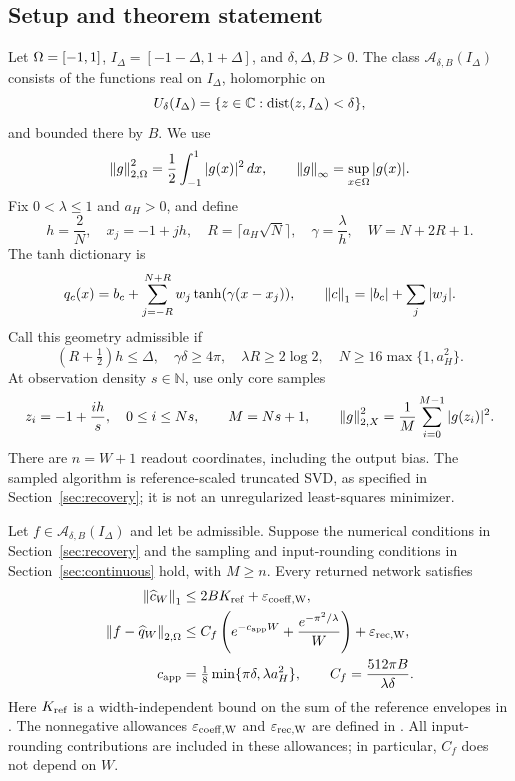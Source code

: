 \subsection{Setup and theorem statement}
\label{sec:setup}
Let $\Omega=[-1,1]$, $I_\Delta=[-1-\Delta,1+\Delta]$, and $\delta,\Delta,B>0$.
The class $\mathcal A_{\delta,B}(I_\Delta)$ consists of the functions real on
$I_\Delta$, holomorphic on
\[
 U_\delta(I_\Delta)=\{z\in\mathbb C:\operatorname{dist}(z,I_\Delta)<\delta\},
\]
and bounded there by $B$. We use
\[
 \left\lVert g\right\rVert_{2,\Omega}^2=\frac12\int_{-1}^1|g(x)|^2\,dx,
 \qquad \left\lVert g\right\rVert_\infty=\sup_{x\in\Omega}|g(x)|.
\]
Fix $0<\lambda\le1$ and $a_H>0$, and define
\begin{equation}
 h=\frac2N,\quad x_j=-1+jh,\quad
 R=\lceil a_H\sqrt N\rceil,\quad \gamma=\frac\lambda h,
 \quad W=N+2R+1.
 \label{eq:geometry}
\end{equation}
The tanh dictionary is
\begin{equation}
 q_c(x)=b_c+\sum_{j=-R}^{N+R}w_j\tanh(\gamma(x-x_j)),
 \qquad \left\lVert c\right\rVert_1=|b_c|+\sum_j|w_j|.
 \label{eq:dictionary}
\end{equation}
Call this geometry admissible if
\begin{equation}
 (R+\tfrac12)h\le\Delta,\quad \gamma\delta\ge4\pi,
 \quad \lambda R\ge2\log2,\quad
 N\ge16\max\{1,a_H^2\}.
 \label{eq:admissible}
\end{equation}
At observation density $s\in\mathbb N$, use only core samples
\begin{equation}
 z_i=-1+\frac{ih}{s},\quad 0\le i\le Ns,
 \qquad M=Ns+1,\qquad
 \left\lVert g\right\rVert_{2,X}^2=\frac1M\sum_{i=0}^{M-1}|g(z_i)|^2.
 \label{eq:samplegrid}
\end{equation}
There are $n=W+1$ readout coordinates, including the output bias. The sampled
algorithm is reference-scaled truncated SVD, as specified in
Section~\ref{sec:recovery}; it is not an unregularized least-squares minimizer.

\begin{theorem}
\label{thm:qi-numerics-explicit}
Let $f\in\mathcal A_{\delta,B}(I_\Delta)$ and let  be
admissible. Suppose the numerical conditions in Section~\ref{sec:recovery}
and the sampling and input-rounding conditions in
Section~\ref{sec:continuous} hold, with $M\ge n$.
Every returned network satisfies
\begin{align}
 \left\lVert \widehat c_W\right\rVert_1
 &\le 2BK_{\rm ref}+\varepsilon_{\rm coeff,W},
 \label{eq:reader-coeff}\\
 \left\lVert f-\widehat q_W\right\rVert_{2,\Omega}
 &\le C_f\left(e^{-c_{\mathrm{app}} W}+\frac{e^{-\pi^2/\lambda}}W\right)
       +\varepsilon_{\rm rec,W},
 \label{eq:reader-error}\\
 c_{\mathrm{app}}&=\tfrac18\min\{\pi\delta,\lambda a_H^2\},
 \qquad C_f=\frac{512\pi B}{\lambda\delta}.
 \label{eq:capp}
\end{align}
Here $K_{\rm ref}$ is a width-independent bound on the sum of the reference
envelopes in . The nonnegative allowances
$\varepsilon_{\rm coeff,W}$ and $\varepsilon_{\rm rec,W}$ are defined in
. All input-rounding contributions
are included in these allowances; in particular, $C_f$ does not depend on $W$.
\end{theorem}

